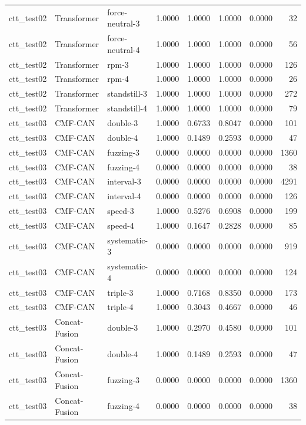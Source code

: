 \begin{tabular}{lllrrrrr}
ctt\_test02 & Transformer & force-neutral-3 & 1.0000 & 1.0000 & 1.0000 & 0.0000 & 32 \\
ctt\_test02 & Transformer & force-neutral-4 & 1.0000 & 1.0000 & 1.0000 & 0.0000 & 56 \\
ctt\_test02 & Transformer & rpm-3 & 1.0000 & 1.0000 & 1.0000 & 0.0000 & 126 \\
ctt\_test02 & Transformer & rpm-4 & 1.0000 & 1.0000 & 1.0000 & 0.0000 & 26 \\
ctt\_test02 & Transformer & standstill-3 & 1.0000 & 1.0000 & 1.0000 & 0.0000 & 272 \\
ctt\_test02 & Transformer & standstill-4 & 1.0000 & 1.0000 & 1.0000 & 0.0000 & 79 \\
ctt\_test03 & CMF-CAN & double-3 & 1.0000 & 0.6733 & 0.8047 & 0.0000 & 101 \\
ctt\_test03 & CMF-CAN & double-4 & 1.0000 & 0.1489 & 0.2593 & 0.0000 & 47 \\
ctt\_test03 & CMF-CAN & fuzzing-3 & 0.0000 & 0.0000 & 0.0000 & 0.0000 & 1360 \\
ctt\_test03 & CMF-CAN & fuzzing-4 & 0.0000 & 0.0000 & 0.0000 & 0.0000 & 38 \\
ctt\_test03 & CMF-CAN & interval-3 & 0.0000 & 0.0000 & 0.0000 & 0.0000 & 4291 \\
ctt\_test03 & CMF-CAN & interval-4 & 0.0000 & 0.0000 & 0.0000 & 0.0000 & 126 \\
ctt\_test03 & CMF-CAN & speed-3 & 1.0000 & 0.5276 & 0.6908 & 0.0000 & 199 \\
ctt\_test03 & CMF-CAN & speed-4 & 1.0000 & 0.1647 & 0.2828 & 0.0000 & 85 \\
ctt\_test03 & CMF-CAN & systematic-3 & 0.0000 & 0.0000 & 0.0000 & 0.0000 & 919 \\
ctt\_test03 & CMF-CAN & systematic-4 & 0.0000 & 0.0000 & 0.0000 & 0.0000 & 124 \\
ctt\_test03 & CMF-CAN & triple-3 & 1.0000 & 0.7168 & 0.8350 & 0.0000 & 173 \\
ctt\_test03 & CMF-CAN & triple-4 & 1.0000 & 0.3043 & 0.4667 & 0.0000 & 46 \\
ctt\_test03 & Concat-Fusion & double-3 & 1.0000 & 0.2970 & 0.4580 & 0.0000 & 101 \\
ctt\_test03 & Concat-Fusion & double-4 & 1.0000 & 0.1489 & 0.2593 & 0.0000 & 47 \\
ctt\_test03 & Concat-Fusion & fuzzing-3 & 0.0000 & 0.0000 & 0.0000 & 0.0000 & 1360 \\
ctt\_test03 & Concat-Fusion & fuzzing-4 & 0.0000 & 0.0000 & 0.0000 & 0.0000 & 38 \\

\end{tabular}
